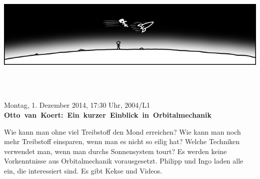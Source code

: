 \documentclass[a4paper,ngerman,landscape]{scrartcl}
\begin{document}
\begin{center}
  \Huge
  \vspace*{0.0em}
  \includegraphics[scale=1.00]{orbit-wide}
  \vspace{0.5em}

  \\[0.6em]
  \\[0.6em]
  \vspace{1em}

  Montag, 1. Dezember 2014, 17:30 Uhr, 2004/L1 \\
  \mbox{\textbf{Otto van Koert: Ein kurzer Einblick in Orbitalmechanik}}

  \Large
  \begin{minipage}{0.80\textwidth}
    \setlength\parskip{\medskipamount}
    \vspace{0.3em}
    Wie kann man ohne viel Treibstoff den Mond erreichen? Wie kann man noch
    mehr Treibstoff einsparen, wenn man es nicht so eilig hat? Welche Techniken
    verwendet man, wenn man durchs Sonnensystem tourt?
    Es werden keine Vorkenntnisse aus Orbitalmechanik vorausgesetzt. Philipp
    und Ingo laden alle ein, die interessiert sind. Es gibt Kekse und Videos.
  \end{minipage}
\end{center}
\end{document}
